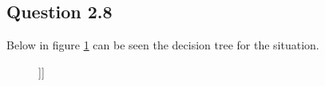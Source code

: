 \subsection*{Question 2.8}

Below in figure \ref{fig:q28decisiontree} can be seen the decision
tree for the situation.

\begin{figure}[!htbp]
  \centering
  \synttree[\fbox{{}\quad{}} [No operation, $U(3)$\quad {}][\setlength{\unitlength}{0.5mm} \begin{picture}(1, 1) \put(-1,3){\circle{8}} \end{picture}[Live, $p=\frac{7}{10}$, $U(12)$][Die, $p = \frac{3}{10}$, $U(0)$]]]
  \caption{}
  \label{fig:q28decisiontree}
\end{figure}
